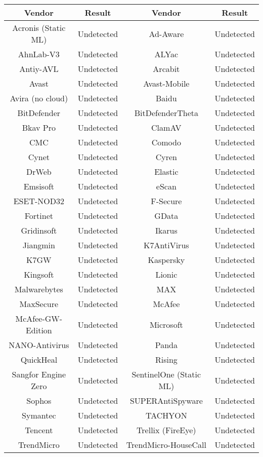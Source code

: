 \begin{table}
\begin{adjustbox}{width=\columnwidth,center}
\begin{tabular}{cccc}
    \toprule
    Vendor&Result&Vendor&Result\\
    \midrule
    Acronis (Static ML)&Undetected&Ad-Aware&Undetected\\
    AhnLab-V3&Undetected&ALYac&Undetected\\
    Antiy-AVL&Undetected&Arcabit&Undetected\\
    Avast&Undetected&Avast-Mobile&Undetected\\
    Avira (no cloud)&Undetected&Baidu&Undetected\\
    BitDefender&Undetected&BitDefenderTheta&Undetected\\
    Bkav Pro&Undetected&ClamAV&Undetected\\
    CMC&Undetected&Comodo&Undetected\\
    Cynet&Undetected&Cyren&Undetected\\
    DrWeb&Undetected&Elastic&Undetected\\
    Emsisoft&Undetected&eScan&Undetected\\
    ESET-NOD32&Undetected&F-Secure&Undetected\\
    Fortinet&Undetected&GData&Undetected\\
    Gridinsoft&Undetected&Ikarus&Undetected\\
    Jiangmin&Undetected&K7AntiVirus&Undetected\\
    K7GW&Undetected&Kaspersky&Undetected\\
    Kingsoft&Undetected&Lionic&Undetected\\
    Malwarebytes&Undetected&MAX&Undetected\\
    MaxSecure&Undetected&McAfee&Undetected\\
    McAfee-GW-Edition&Undetected&Microsoft&Undetected\\
    NANO-Antivirus&Undetected&Panda&Undetected\\
    QuickHeal&Undetected&Rising&Undetected\\
    Sangfor Engine Zero&Undetected&SentinelOne (Static ML)&Undetected\\
    Sophos&Undetected&SUPERAntiSpyware&Undetected\\
    Symantec&Undetected&TACHYON&Undetected\\
    Tencent&Undetected&Trellix (FireEye)&Undetected\\
    TrendMicro&Undetected&TrendMicro-HouseCall&Undetected\\

\end{tabular}
\end{adjustbox}
\end{table}

